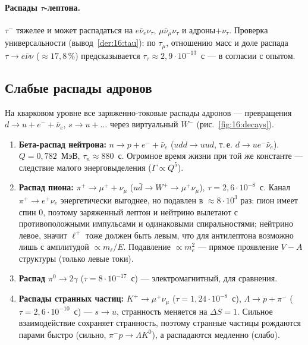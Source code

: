 \paragraph{Распады $\tau$-лептона.} $\tau^-$ тяжелее и может распадаться на $e\bar\nu_e\nu_\tau$, $\mu\bar\nu_\mu\nu_\tau$ и адроны+$\nu_\tau$.
Проверка универсальности (вывод~\ref{der:16:tau}): по $\tau_\mu$, отношению масс и доле распада $\tau\to e\bar\nu\nu$ ($\approx17{,}8\,\%$)
предсказывается $\tau_\tau\approx2{,}9\cdot10^{-13}$~с — в согласии с опытом.

\subsection{Слабые распады адронов}

На кварковом уровне все заряженно-токовые распады адронов — превращения $d\to u+e^-+\bar\nu_e$, $s\to u+\dots$ через
виртуальный $W^-$ (рис.~\ref{fig:16:decays}).

\begin{enumerate}
 \item \textbf{Бета-распад нейтрона:} $n\to p+e^-+\bar\nu_e$ ($udd\to uud$, т.\,е. $d\to ue^-\bar\nu_e$). $Q=0{,}782$~МэВ, $\tau_n\approx880$~с.
       Огромное время жизни при той же константе — следствие малого энерговыделения ($\Gamma\propto Q^5$).
 \item \textbf{Распад пиона:} $\pi^+\to\mu^++\nu_\mu$ ($u\bar d\to W^+\to\mu^+\nu_\mu$), $\tau=2{,}6\cdot10^{-8}$~с. Канал $\pi^+\to e^+\nu_e$
       энергетически выгоднее, но подавлен в $\approx8\cdot10^3$ раз: пион имеет спин 0, поэтому заряженный лептон и нейтрино
       вылетают с противоположными импульсами и одинаковыми спиральностями; нейтрино левое, значит $\ell^+$ тоже
       должен быть левым, что для антилептона возможно лишь с амплитудой $\propto m_\ell/E$. Подавление $\propto m_e^2$ —
       прямое проявление $V\!-\!A$ структуры (только левые токи).
 \item \textbf{Распад $\pi^0\to2\gamma$} ($\tau=8\cdot10^{-17}$~с) — электромагнитный, для сравнения.
 \item \textbf{Распады странных частиц:} $K^+\to\mu^+\nu_\mu$ ($\tau=1{,}24\cdot10^{-8}$~с), $\Lambda\to p+\pi^-$ ($\tau=2{,}6\cdot10^{-10}$~с) —
       $s\to u$, странность меняется на $\Delta S=1$. Сильное взаимодействие сохраняет странность, поэтому странные частицы
       рождаются парами быстро (сильно, $\pi^-p\to\Lambda K^0$), а распадаются медленно (слабо).
\end{enumerate}

